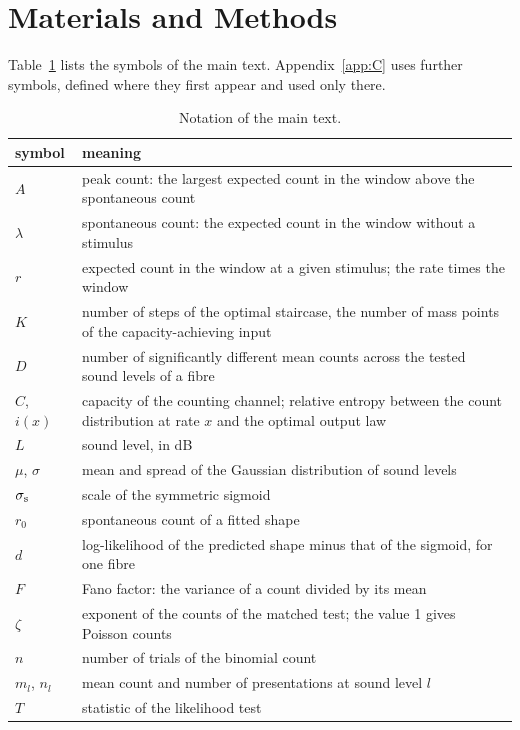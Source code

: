 \documentclass[10pt,letterpaper]{article}
\begin{document}
\section{Materials and Methods}\label{sec:methods}

Table~\ref{tab:notation} lists the symbols of the main text. Appendix~\ref{app:C} uses further symbols, defined where they first
appear and used only there.

\begin{table}[tp]
\caption{Notation of the main text.}\label{tab:notation}
\centering
\small
\begin{tabular}{>{\raggedright\arraybackslash}p{2.0cm}>{\raggedright\arraybackslash}p{11.0cm}}
\hline
symbol & meaning\\
\hline
$A$ & peak count: the largest expected count in the window above the spontaneous count\\
$\lambda$ & spontaneous count: the expected count in the window without a stimulus\\
$r$ & expected count in the window at a given stimulus; the rate times the window\\
$K$ & number of steps of the optimal staircase, the number of mass points of the capacity-achieving input\\
$D$ & number of significantly different mean counts across the tested sound levels of a fibre\\
$C$, $i(x)$ & capacity of the counting channel; relative entropy between the count distribution at rate $x$ and the optimal output law\\
$L$ & sound level, in dB\\
$\mu$, $\sigma$ & mean and spread of the Gaussian distribution of sound levels\\
$\sigma_{\rm s}$ & scale of the symmetric sigmoid\\
$r_0$ & spontaneous count of a fitted shape\\
$d$ & log-likelihood of the predicted shape minus that of the sigmoid, for one fibre\\
$F$ & Fano factor: the variance of a count divided by its mean\\
$\zeta$ & exponent of the counts of the matched test; the value 1 gives Poisson counts\\
$n$ & number of trials of the binomial count\\
$m_l$, $n_l$ & mean count and number of presentations at sound level $l$\\
$T$ & statistic of the likelihood test\\
\hline
\end{tabular}
\end{table}
\end{document}
